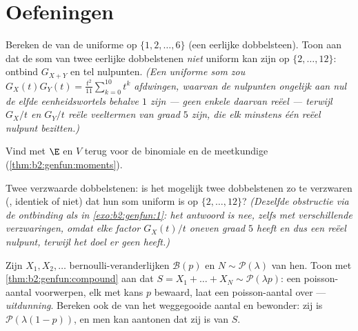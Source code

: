 \section{Oefeningen}

\begin{exercise}[$\star$]\label{exo:b2:genfun:1}
Bereken de  van de uniforme  op $\{1,
2, \dots, 6\}$ (een eerlijke dobbelsteen). Toon aan dat de som van
twee eerlijke dobbelstenen \emph{niet} uniform kan zijn op $\{2,
\dots, 12\}$: ontbind $G_{X+Y}$ en tel nulpunten. \emph{(Een
uniforme som zou $G_X(t)G_Y(t) =
\frac{t^2}{11}\sum_{k=0}^{10}t^k$ afdwingen, waarvan de nulpunten
ongelijk aan nul de elfde eenheidswortels behalve $1$ zijn ---
geen enkele daarvan reëel --- terwijl $G_X/t$ en $G_Y/t$ reële
veeltermen van graad $5$ zijn, die elk minstens één reëel nulpunt
bezitten.)}
\end{exercise}

\begin{exercise}[$\star$]\label{exo:b2:genfun:2}
Vind met  $\E$ en $V$ terug voor de binomiale
en de meetkundige  (\cref{thm:b2:genfun:moments}).
\end{exercise}

\begin{exercise}[$\star$]\label{exo:b2:genfun:3}
Twee verzwaarde dobbelstenen: is het mogelijk twee dobbelstenen zo
te verzwaren (, identiek of niet) dat hun som uniform
is op $\{2, \dots, 12\}$? \emph{(Dezelfde obstructie via de
ontbinding als in \cref{exo:b2:genfun:1}: het antwoord is nee, zelfs
met verschillende verzwaringen, omdat elke factor $G_X(t)/t$ oneven
graad $5$ heeft en dus een reëel nulpunt, terwijl het doel er geen
heeft.)}
\end{exercise}

\begin{exercise}[$\star\star$]\label{exo:b2:genfun:4}
Zijn $X_1, X_2, \dots$  bernoulli-veranderlijken
$\mathcal{B}(p)$ en $N \sim \mathcal{P}(\lambda)$  van
hen. Toon met \cref{thm:b2:genfun:compound} aan dat $S = X_1 +
\dots + X_N \sim \mathcal{P}(\lambda p)$: een poisson-aantal
voorwerpen, elk met kans $p$ bewaard, laat een poisson-aantal over
--- \emph{uitdunning}. Bereken ook de  van het weggegooide
aantal en bewonder: zij is $\mathcal{P}(\lambda(1-p))$, en men kan
aantonen dat zij  is van $S$.
\end{exercise}


